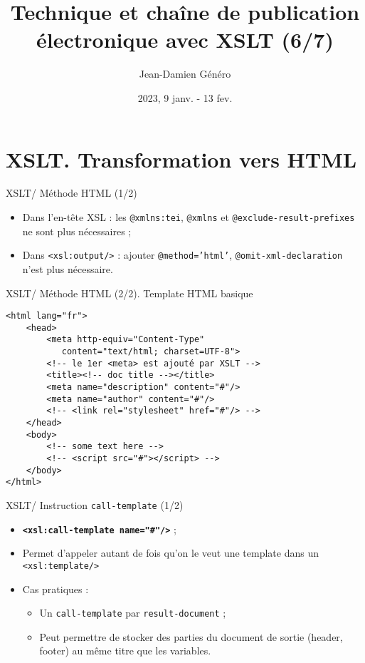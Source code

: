 \documentclass{beamer}
\title{Technique et chaîne de publication électronique avec XSLT (6/7)}
\date{2023, 9 janv. - 13 fev.}
\author{Jean-Damien Généro}
\institute{École nationale des chartes -- M2 TNAH}
\begin{document}
    \maketitle

    \section{XSLT. Transformation vers HTML}

    \begin{frame}{XSLT/ Méthode HTML (1/2)}
        \Large
        \begin{itemize}
            \item Dans l'en-tête XSL : les \texttt{@xmlns:tei}, \texttt{@xmlns} et \texttt{@exclude-result-prefixes} ne sont plus nécessaires ;
            \bigskip
            \item Dans \texttt{<xsl:output/>} : ajouter \texttt{@method='html'}, \texttt{@omit-xml-declaration} n'est plus nécessaire.
        \end{itemize}
    \end{frame}

    \begin{frame}[fragile]{XSLT/ Méthode HTML (2/2). Template HTML basique}
        \begin{verbatim}
<html lang="fr">
    <head>
        <meta http-equiv="Content-Type" 
           content="text/html; charset=UTF-8">
        <!-- le 1er <meta> est ajouté par XSLT -->
        <title><!-- doc title --></title>
        <meta name="description" content="#"/>
        <meta name="author" content="#"/>
        <!-- <link rel="stylesheet" href="#"/> -->
    </head>
    <body>
        <!-- some text here -->
        <!-- <script src="#"></script> -->
    </body>
</html>
        \end{verbatim}
    \end{frame}
    
    \begin{frame}{XSLT/ Instruction \texttt{call-template} (1/2)}
        \Large
        \begin{itemize}
            \item \textbf{\texttt{<xsl:call-template name="\#"/>}} ;
            \item Permet d'appeler autant de fois qu'on le veut une template dans un \texttt{<xsl:template/>}
            \item Cas pratiques :
            \begin{itemize}
            \Large
                \item Un \texttt{call-template} par \texttt{result-document} ;
                \item Peut permettre de stocker des parties du document de sortie (header, footer) au même titre que les variables.
            \end{itemize}
        \end{itemize}
    \end{frame}
\end{document}
